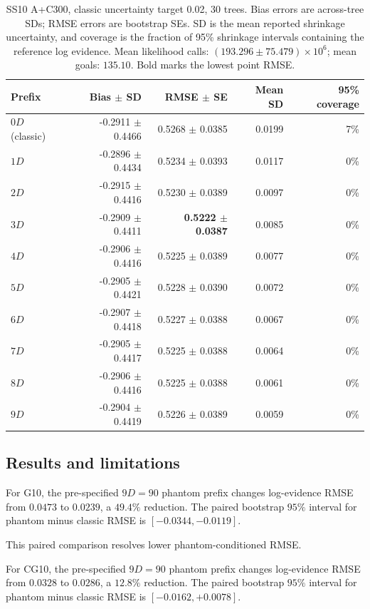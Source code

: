 \documentclass[pdflatex,sn-basic,icol]{sn-jnl}
\theoremstyle{plain}
\theoremstyle{definition}
\begin{document}
\begin{table}[t]
\centering
\scriptsize
\caption{SS10 A+C300, classic uncertainty target 0.02, 30 trees. Bias errors are across-tree SDs; RMSE errors are bootstrap SEs. SD is the mean reported shrinkage uncertainty, and coverage is the fraction of 95\% shrinkage intervals containing the reference log evidence. Mean likelihood calls: $(193.296\pm75.479)\times10^6$; mean goals: $135.10$. Bold marks the lowest point RMSE.}
\label{tab:phantom_evidence_ss10_0p02}
\begin{tabular}{lrrrr}
\toprule
Prefix & Bias $\pm$ SD & RMSE $\pm$ SE & Mean SD & 95\% coverage \\
\midrule
$0D$ (classic) & -0.2911 $\pm$ 0.4466 & 0.5268 $\pm$ 0.0385 & 0.0199 & 7\% \\
$1D$ & -0.2896 $\pm$ 0.4434 & 0.5234 $\pm$ 0.0393 & 0.0117 & 0\% \\
$2D$ & -0.2915 $\pm$ 0.4416 & 0.5230 $\pm$ 0.0389 & 0.0097 & 0\% \\
$3D$ & -0.2909 $\pm$ 0.4411 & \textbf{0.5222 $\pm$ 0.0387} & 0.0085 & 0\% \\
$4D$ & -0.2906 $\pm$ 0.4416 & 0.5225 $\pm$ 0.0389 & 0.0077 & 0\% \\
$5D$ & -0.2905 $\pm$ 0.4421 & 0.5228 $\pm$ 0.0390 & 0.0072 & 0\% \\
$6D$ & -0.2907 $\pm$ 0.4418 & 0.5227 $\pm$ 0.0388 & 0.0067 & 0\% \\
$7D$ & -0.2905 $\pm$ 0.4417 & 0.5225 $\pm$ 0.0388 & 0.0064 & 0\% \\
$8D$ & -0.2906 $\pm$ 0.4416 & 0.5225 $\pm$ 0.0388 & 0.0061 & 0\% \\
$9D$ & -0.2904 $\pm$ 0.4419 & 0.5226 $\pm$ 0.0389 & 0.0059 & 0\% \\
\bottomrule
\end{tabular}
\end{table}
\clearpage
\subsection{Results and limitations}

For G10, the pre-specified $9D=90$ phantom prefix changes log-evidence RMSE from $0.0473$ to $0.0239$, a $49.4\%$ reduction.
The paired bootstrap $95\%$ interval for phantom minus classic RMSE is $[-0.0344,-0.0119]$.

This paired comparison resolves lower phantom-conditioned RMSE.

For CG10, the pre-specified $9D=90$ phantom prefix changes log-evidence RMSE from $0.0328$ to $0.0286$, a $12.8\%$ reduction.
The paired bootstrap $95\%$ interval for phantom minus classic RMSE is $[-0.0162,+0.0078]$.
\end{document}
